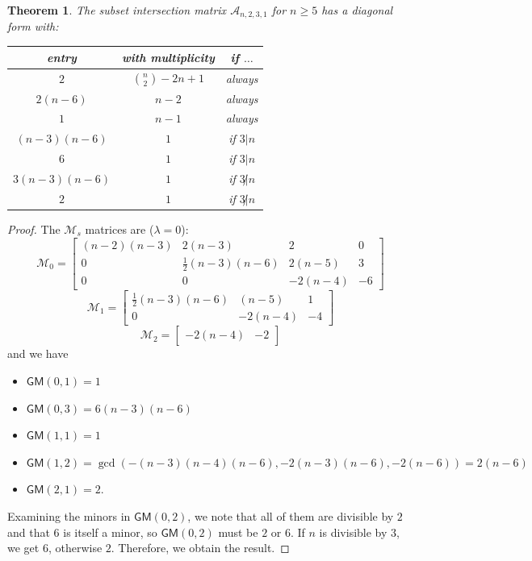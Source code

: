 \documentclass[11pt]{article}
\newtheorem{theorem}[theo]{Theorem}
\theoremstyle{definition}
\numberwithin{equation}{section}
\numberwithin{equation}{section}
\newcommand{\M}{\mathcal{M}}
\newcommand{\A}{\mathcal{A}}
\newcommand{\GM}{\mathsf{GM}}
\begin{document}
\begin{theorem}
The subset intersection matrix $\A_{n, 2, 3, 1}$ for $n \geq 5$ has a diagonal form with:
\begin{center}
\begin{tabular}{ |c|c|c| } 
 \hline
 entry & with multiplicity & if $\ldots$ \\
 \hline
 $2$ & $\binom{n}{2} - 2n + 1$ & always \\
 $2(n - 6)$ & $n - 2$ & always \\
 $1$ & $n - 1$ & always \\
 $(n-3)(n-6)$ & $1$ & if $3 | n$ \\
 $6$ & $1$ & if $3 | n$ \\
 $3(n-3)(n-6)$ & $1$ & if $3 \not | n$ \\
 $2$ & $1$ & if $3 \not | n$ \\
 \hline
\end{tabular}
\end{center}
\end{theorem}
\begin{proof}
The $\M_s$ matrices are ($\lambda = 0$):
\[ \M_0 = \begin{bmatrix} (n-2)(n-3) & 2(n-3) & 2 & 0 \\ 0 & \frac{1}{2}(n-3)(n-6) & 2(n-5) & 3 \\ 0 & 0 & -2(n-4) & -6 \end{bmatrix}  \]
\[ \M_1 = \begin{bmatrix} \frac{1}{2}(n-3)(n-6) & (n-5) & 1 \\ 0 & -2(n-4) & -4 \end{bmatrix}  \]
\[ \M_2 = \begin{bmatrix} -2(n-4) & -2 \end{bmatrix}  \]
and we have
\begin{itemize} 
    \item $\GM(0,1) = 1$
    \item $\GM(0,3) = 6(n - 3)(n - 6)$
    \item $\GM(1,1) = 1$
    \item $\GM(1,2) = \gcd( -(n - 3)(n - 4)(n - 6), -2(n - 3)(n - 6), -2(n - 6) ) = 2(n-6)$
    \item $\GM(2,1) = 2$.
\end{itemize}

Examining the minors in $\GM(0,2)$, we note that all of them are divisible by $2$ and that $6$ is itself a minor, so $\GM(0,2)$ must be $2$ or $6$.
If $n$ is divisible by $3$, we get $6$, otherwise $2$.  Therefore, we obtain the result.
\end{proof}
\end{document}
